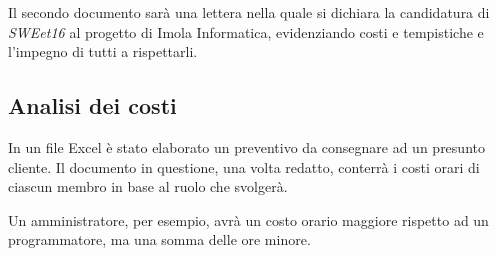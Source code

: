 \documentclass[a4paper, 11pt]{article}
\begin{document}
Il secondo documento sarà una lettera nella quale si dichiara la candidatura di \textit{SWEet16} al progetto di Imola Informatica, evidenziando costi e tempistiche e l'impegno di tutti a rispettarli.\newline

\subsection{Analisi dei costi}

In un file Excel è stato elaborato un preventivo da consegnare ad un presunto cliente. Il documento in questione, una volta redatto, conterrà i costi orari di ciascun membro in base al ruolo che svolgerà. 

Un amministratore, per esempio, avrà un costo orario maggiore rispetto ad un programmatore, ma una somma delle ore minore.
\end{document}
